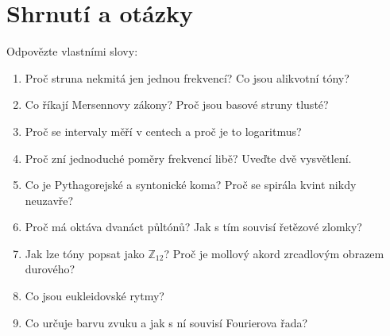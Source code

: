 \section{Shrnutí a otázky}

\begin{problem}
  Odpovězte vlastními slovy:
  \begin{enumerate}
    \item Proč struna nekmitá jen jednou frekvencí? Co jsou alikvotní tóny?
    \item Co říkají Mersennovy zákony? Proč jsou basové struny tlusté?
    \item Proč se intervaly měří v centech a proč je to logaritmus?
    \item Proč zní jednoduché poměry frekvencí libě? Uveďte dvě vysvětlení.
    \item Co je Pythagorejské a syntonické koma? Proč se spirála kvint nikdy neuzavře?
    \item Proč má oktáva dvanáct půltónů? Jak s tím souvisí řetězové zlomky?
    \item Jak lze tóny popsat jako $\mathbb{Z}_{12}$? Proč je mollový akord zrcadlovým obrazem durového?
    \item Co jsou eukleidovské rytmy?
    \item Co určuje barvu zvuku a jak s ní souvisí Fourierova řada?
  \end{enumerate}
\end{problem}
